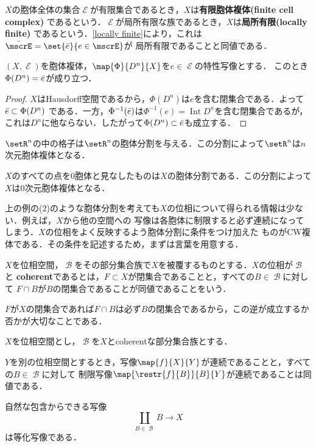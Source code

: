 \documentclass[uplatex]{jsarticle}
\DeclareMathOperator{\Int}{Int}
\newcommand{\setinverse}[2]{#1 ^{-1}(#2)}
\begin{document}
$X$の胞体全体の集合$\mscrE$が有限集合であるとき，$X$は\textbf{有限胞体複体(finite cell complex)}
であるという．$\mscrE$が局所有限な族であるとき，$X$は\textbf{局所有限(locally finite)}
であるという．\cref{locally finite}により，これは$\Bar{\mscrE}=\set{\Bar{e}}{e\in \mscrE}$が
局所有限であることと同値である．

\begin{proposition}
  $(X,\mscrE)$を胞体複体，$\map{\Phi}{D^n}{X}$を$e\in \mscrE$の特性写像とする．
  このとき$\Phi(D^n)=\Bar{e}$が成り立つ．
\end{proposition}

\begin{proof}
  $X$はHausdorff空間であるから，$\Phi(D^n)$は$e$を含む閉集合である．よって$\Bar{e}\subset \Phi(D^n)$
  である．一方，$\setinverse{\Phi}{\Bar{e}}$は$\setinverse{\Phi}{e}=\Int D^n$を含む閉集合であるが，
  これは$D^n$に他ならない．したがって$\Phi(D^n)\subset \Bar{e}$も成立する．
\end{proof}

\begin{example}\label{cell complex e.g.}

  \begin{enumarabicp}
    \item
    $\setR^n$の中の格子は$\setR^n$の胞体分割を与える．この分割によって$\setR^n$は$n$次元胞体複体となる．
    \item
    $X$のすべての点を0胞体と見なしたものは$X$の胞体分割である．この分割によって$X$は0次元胞体複体となる．
  \end{enumarabicp}
\end{example}

上の例の(2)のような胞体分割を考えても$X$の位相について得られる情報は少ない．例えば，$X$から他の空間への
写像は各胞体に制限すると必ず連続になってしまう．$X$の位相をよく反映するよう胞体分割に条件をつけ加えた
ものがCW複体である．その条件を記述するため，まずは言葉を用意する．

\begin{definition}
  $X$を位相空間，$\mscrB$をその部分集合族で$X$を被覆するものとする．$X$の位相が$\mscrB$と
  \textbf{coherent}であるとは，$F\subset X$が閉集合であることと，すべての$B\in \mscrB$に対して
  $F\cap B$が$B$の閉集合であることが同値であることをいう．
\end{definition}

$F$が$X$の閉集合であれば$F\cap B$は必ず$B$の閉集合であるから，この逆が成立するか否かが大切なことである．

\begin{proposition}
  $X$を位相空間とし，$\mscrB$を$X$とcoherentな部分集合族とする．
  \begin{enumarabicp}
    \item
    $Y$を別の位相空間とするとき，写像$\map{f}{X}{Y}$が連続であることと，すべての$B\in \mscrB$に対して
    制限写像$\map{\restr{f}{B}}{B}{Y}$が連続であることは同値である．
    \item
    自然な包含からできる写像
    \[ \coprod_{B\in \mscrB} B \to X \]
    は等化写像である．
  \end{enumarabicp}
\end{proposition}
\end{document}
